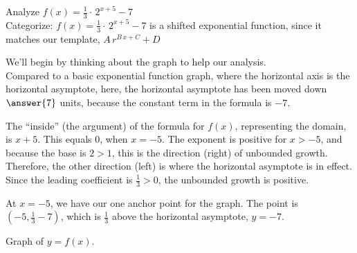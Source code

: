 \documentclass{ximera}
\begin{document}
\begin{example}  



Analyze   $f(x) = \frac{1}{3} \cdot \, 2^{x+5} - 7$ \\



Categorize:   $f(x) = \frac{1}{3} \cdot \, 2^{x+5} - 7$ is a shifted exponential function, since it matches our template, $A \, r^{B \, x + C} + D$





\begin{idea}


We'll begin by thinking about the graph to help our analysis. \\

Compared to a basic exponential function graph, where the horizontal axis is the horizontal asymptote, here, the horizontal asymptote has been moved down $\answer{7}$ units, because the constant term in the formula is $-7$.



The ``inside'' (the argument) of the formula for $f(x)$, representing the domain, is $x+5$.  This equals $0$, when $x=-5$.  The exponent is positive for $x>-5$, and because the base is $2 > 1$, this is the direction (right) of unbounded growth.  Therefore, the other direction (left) is where the horizontal asymptote is in effect.  Since the leading coefficient is $\frac{1}{3} > 0$, the unbounded growth is positive.

At $x=-5$, we have our one anchor point for the graph.  The point is $\left(-5, \frac{1}{3} - 7 \right)$, which is $\frac{1}{3}$ above the horizontal asymptote, $y = -7$.


Graph of $y = f(x)$.

\begin{image}
\end{image}
\end{idea}
\end{example}
\end{document}
